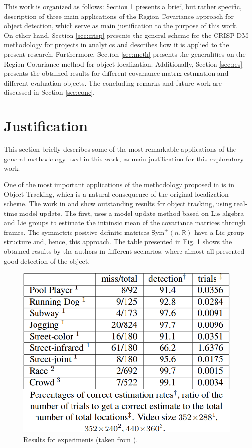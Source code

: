 \documentclass[11pt]{article}
\theoremstyle{definition}
\theoremstyle{remark}
\theoremstyle{remark}
\theoremstyle{remark}
\begin{document}
This work is organized as follows: Section \ref{sec:just} presents a brief, but rather specific, description of three main applications of the Region Covariance approach for object detection, which serve as main justification to the purpose of this work. On other hand, Section \ref{sec:crisp} presents the general scheme for the CRISP-DM methodology for projects in analytics and describes how it is applied to the present research. Furthermore, Section \ref{sec:meth} presents the generalities on the Region Covariance method for object localization. Additionally, Section \ref{sec:res} presents the obtained results for different covariance matrix estimation and different evaluation objects. The concluding remarks and future work are discussed in Section \ref{sec:conc}.

\section{Justification}\label{sec:just}
This section briefly describes some of the most remarkable applications of the general methodology used in this work, as main justification for this exploratory work.

One of the most important applications of the methodology proposed in \parencite{tuzel2006} is in Object Tracking, which is a natural consequence of the original localization scheme. The work in \parencite{porikli2006covariance} and \parencite{wu2012real} show outstanding results for object tracking, using real-time model update. The first, uses a model update method based on Lie algebra and Lie groups to estimate the intrinsic mean of the covariance matrices through frames. The symmetric positive definite matrices $\mathrm{Sym}^+(n,\mathbb{R})$ have a Lie group structure and, hence, this approach. The table presented in Fig. \ref{fig:res_lie} shows the obtained results by the authors in different scenarios, where almost all presented good detection of the object.

\begin{figure}[H]
    \centering
    \caption{Results for experiments (taken from \cite{porikli2006covariance}).}
    \label{fig:res_lie}
    \includegraphics[scale=0.3]{res_lie.png}
\end{figure}
\end{document}
